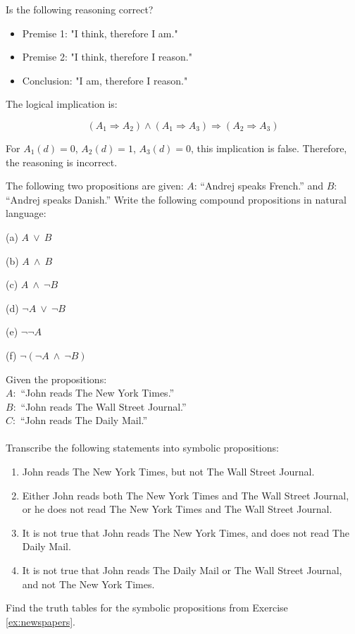 \documentclass[11pt,paper=b5,footinclude,headinclude]{scrbook} %
\def\ali {{~\vee~}}
\def\inn {{~\wedge~}}
\theoremstyle{remark}
\theoremstyle{definition} %
\theoremstyle{theorem} %
\newtheorem{ex}{Exercise\hypertarget{sol:\theex}}[chapter]
\begin{document}
\begin{ex}
Is the following reasoning correct?

\begin{itemize}
    \item Premise 1: "I think, therefore I am."
    \item Premise 2: "I think, therefore I reason."
    \item Conclusion: "I am, therefore I reason."
\end{itemize}
\begin{sol}
The logical implication is:

\[
(A_1 \Rightarrow A_2) \land (A_1 \Rightarrow A_3) \Rightarrow (A_2 \Rightarrow A_3)
\]

For \( A_1(d) = 0 \), \( A_2(d) = 1 \), \( A_3(d) = 0 \), this implication is false. Therefore, the reasoning is incorrect.
\end{sol}




\end{ex} \begin{ex}
The following two propositions are given:
$A$: ``Andrej speaks French.'' and $B$: ``Andrej speaks Danish.''
Write the following compound propositions in natural language:

(a) $A\ali B$

(b) $A\inn B$

(c) $A\inn \neg B$

(d) $\neg A\ali \neg B$

(e) $\neg \neg A$

(f) $\neg (\neg A\inn \neg B)$


\end{ex} \begin{ex} \label{ex:newspapers} Given the propositions:\\
$A:$ ``John reads The New York Times.''\\
$B:$ ``John reads The Wall Street Journal.''\\
$C:$ ``John reads The Daily Mail.''\\
\\
Transcribe the following statements into symbolic propositions:
\begin{enumerate}
\item John reads The New York Times, but not The Wall Street Journal.
\item Either John reads both The New York Times and The Wall Street Journal,
or he does not read The New York Times and The Wall Street Journal.
\item It is not true that John reads The New York Times, and does not read
The Daily Mail.
\item It is not true that John reads The Daily Mail or The Wall Street Journal,
and not The New York Times.
\end{enumerate}
\end{ex} \begin{ex} Find the truth tables for the symbolic propositions from Exercise \ref{ex:newspapers}.



\end{ex}
\end{document}
